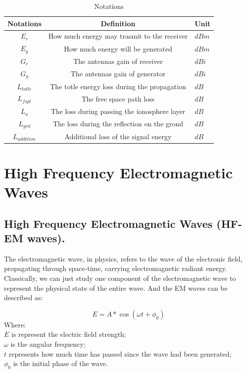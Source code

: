 \documentclass{mcmthesis}
\begin{document}
    \begin{table}[h]
      \centering
        \begin{tabular}{|c|c|l|}

          \hline Notations & Definition & Unit \\
          \hline $E_{r}$ & How much energy may trasmit to the receiver & $dBm$ \\
          \hline $E_{g}$ & How much energy will be generated & $dBm$ \\
          \hline $G_{r}$ & The antennas gain of receiver & $dBi$ \\
          \hline $G_{g}$ & The antennas gain of generator & $dBi$ \\
          \hline $L_{totle}$ & The totle energy loss during the propagation & $dB$ \\
          \hline $L_{fspl}$ & The free space path loss & $dB$ \\
          \hline $L_{a}$ & The loss during passing the ionosphere layer & $dB$ \\
          \hline $L_{grd}$ & The loss during the reflection on the grond & $dB$ \\
          \hline $L_{addition}$ & Additional loss of the signal energy & $dB$ \\
          \hline

        \end{tabular}
        \caption{Notations}
    		\label{tab:Notations}
    \end{table}



\section{High Frequency Electromagnetic Waves}
  \subsection{High Frequency Electromagnetic Waves (HF-EM waves).}

    The electromagnetic wave, in physics, refers to the wave of the electronic field, propagating through space-time, carrying electromagnetic radiant energy. Classically, we can just study one component of the electromagnetic wave to represent the physical state of the entire wave. And the EM waves can be described as:

      \begin{equation}\label{eq:EMW}
        E = A * \cos(\omega t + \phi_{0})
      \end{equation}
      Where: \\
      $E$ is represent the electric field strength; \\
      $\omega$ is the angular frequency;\\
      $t$ represents how much time has passed since the wave had been generated;\\
      $\phi_{0}$ is the initial phase of the wave.\\
\end{document}
